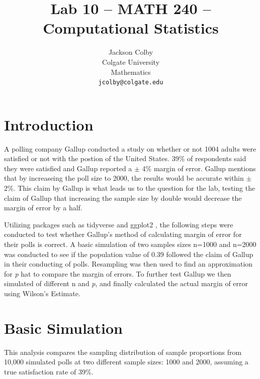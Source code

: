 \documentclass{article}\usepackage[]{graphicx}\usepackage[]{xcolor}
\begin{document}
\vspace{-1in}
\title{Lab 10 -- MATH 240 -- Computational Statistics}

\author{
  Jackson Colby \\
  Colgate University  \\
  Mathematics  \\
  {\tt jcolby@colgate.edu}
}

\date{}

\maketitle

\begin{multicols}{2}

\section{Introduction}
A polling company Gallup conducted a study on whether or not 1004 adults were satisfied or not with the postion of the United States. 39\% of respondents said they were satisfied and Gallup reported a $\pm$ 4\% margin of error. Gallup mentions that by increaseing the poll size to 2000, the results would be accurate within $\pm$ 2\%. This claim by Gallup is what leads us to the question for the lab, testing the claim of Gallup that increasing the sample size by double would decrease the margin of error by a half.

Utilizing packages such as tidyverse \citep{tidyverse} and ggplot2 \citep{ggplot2}, the following steps were conducted to test whether Gallup's method of calculating margin of error for their polls is correct. A basic simulation of two samples sizes n=1000 and n=2000 was conducted to see if the population value of 0.39 followed the claim of Gallup in their conducting of polls. Resampling was then used to find an approximation for \emph{p} hat to compare the margin of errors. To further test Gallup we then simulated of different n and \emph{p}, and finally calculated the actual margin of error using Wilson's Estimate.

\section{Basic Simulation}

This analysis compares the sampling distribution of sample proportions from 10,000 simulated polls at two different sample sizes: 1000 and 2000, assuming a true satisfaction rate of 39\%.


\end{multicols}
\end{document}
